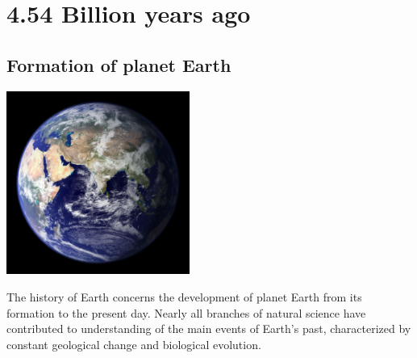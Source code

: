 \documentclass[11pt]{report}
\begin{document}

\chapter{4.54 Billion years ago}
\section{Formation of planet Earth}
\vspace{2mm}\begin{center}\includegraphics[width=6cm]{./img/earth.jpg}\end{center}
The history of Earth concerns the development of planet Earth from its formation to the present day. Nearly all branches of natural science have contributed to understanding of the main events of Earth's past, characterized by constant geological change and biological evolution.
\end{document}
